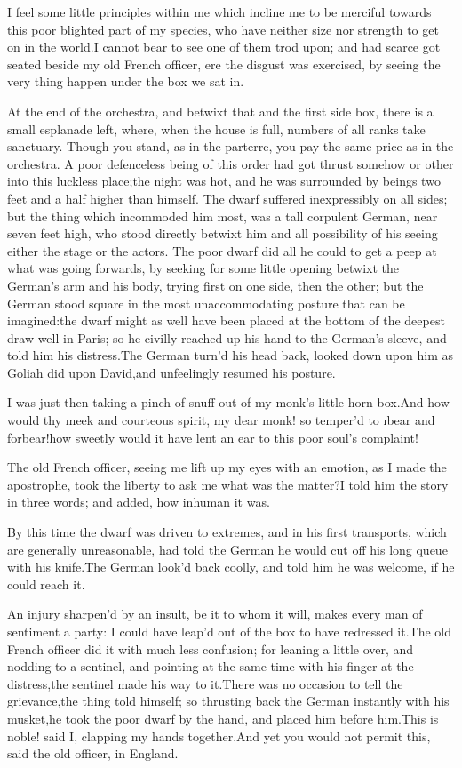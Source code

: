 \documentclass[twoside]{article}
\begin{document}
I feel some little principles within me which incline me to be merciful
towards this poor blighted part of my species, who have neither size nor
strength to get on in the world.\tsk I cannot bear to see one of them trod
upon; and had scarce got seated beside my old French officer, ere the
disgust was exercised, by seeing the very thing happen under the box we
sat in.

At the end of the orchestra, and betwixt that and the first side box,
there is a small esplanade left, where, when the house is full, numbers
of all ranks take sanctuary.  Though you stand, as in the parterre, you
pay the same price as in the orchestra.  A poor defenceless being of this
order had got thrust somehow or other into this luckless place;\tsk the night
was hot, and he was surrounded by beings two feet and a half higher than
himself.  The dwarf suffered inexpressibly on all sides; but the thing
which incommoded him most, was a tall corpulent German, near seven feet
high, who stood directly betwixt him and all possibility of his seeing
either the stage or the actors.  The poor dwarf did all he could to get a
peep at what was going forwards, by seeking for some little opening
betwixt the German’s arm and his body, trying first on one side, then the
other; but the German stood square in the most unaccommodating posture
that can be imagined:\tsk the dwarf might as well have been placed at the
bottom of the deepest draw-well in Paris; so he civilly reached up his
hand to the German’s sleeve, and told him his distress.\tsk The German turn’d
his head back, looked down upon him as Goliah did upon David,\tsk and
unfeelingly resumed his posture.

I was just then taking a pinch of snuff out of my monk’s little horn
box.\tsk And how would thy meek and courteous spirit, my dear monk! so
temper’d to \i{bear and forbear}!\tsk how sweetly would it have lent an ear to
this poor soul’s complaint!

The old French officer, seeing me lift up my eyes with an emotion, as I
made the apostrophe, took the liberty to ask me what was the matter?\tsk I
told him the story in three words; and added, how inhuman it was.

By this time the dwarf was driven to extremes, and in his first
transports, which are generally unreasonable, had told the German he
would cut off his long queue with his knife.\tsk The German look’d back
coolly, and told him he was welcome, if he could reach it.

An injury sharpen’d by an insult, be it to whom it will, makes every man
of sentiment a party: I could have leap’d out of the box to have
redressed it.\tsk The old French officer did it with much less confusion; for
leaning a little over, and nodding to a sentinel, and pointing at the
same time with his finger at the distress,\tsk the sentinel made his way to
it.\tsk There was no occasion to tell the grievance,\tsk the thing told himself;
so thrusting back the German instantly with his musket,\tsk he took the poor
dwarf by the hand, and placed him before him.\tsk This is noble! said I,
clapping my hands together.\tsk And yet you would not permit this, said the
old officer, in England.
\end{document}
